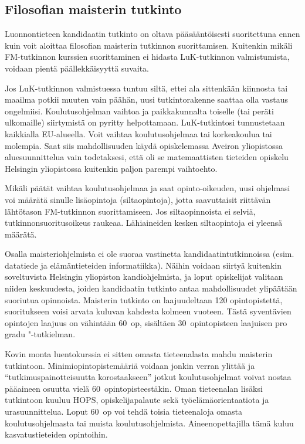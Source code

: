 \documentclass[a5paper, 8pt, twocolumn]{book} %
\numberwithin{equation}{section}
\begin{document}
\subsection*{Filosofian maisterin tutkinto}
Luonnontieteen kandidaatin tutkinto
on oltava pääsääntöisesti suoritettuna ennen
kuin voit aloittaa filosofian maisterin
tutkinnon suorittamisen. Kuitenkin mikäli
FM-tutkinnon kurssien suorittaminen ei
hidasta LuK-tutkinnon valmistumista, voidaan
pientä päällekkäisyyttä suvaita.

Jos LuK-tutkinnon valmistuessa tuntuu
siltä, ettei ala sittenkään kiinnosta tai
maailma potkii muuten vain päähän, uusi
tutkintorakenne saattaa olla vastaus ongelmiisi.
Koulutusohjelman vaihtoa ja paikkakunnalta
toiselle (tai peräti ulkomaille) siirtymistä
on pyritty helpottamaan. LuK-tutkintosi
tunnustetaan kaikkialla EU-alueella. Voit
vaihtaa koulutusohjelmaa tai korkeakoulua tai
molempia. Saat siis mahdollisuuden käydä
opiskelemassa Aveiron yliopistossa aluesuunnittelua
vain todetaksesi, että oli se
matemaattisten tieteiden opiskelu Helsingin yliopistossa
kuitenkin paljon parempi vaihtoehto.

Mikäli päätät vaihtaa koulutusohjelmaa ja saat
opinto-oikeuden, uusi ohjelmasi voi
määrätä sinulle lisäopintoja (siltaopintoja), jotta
saavuttaisit riittävän lähtötason FM-tutkinnon
suorittamiseen. Jos siltaopinnoista ei
selviä, tutkinnonsuoritusoikeus
raukeaa. Lähiaineiden kesken siltaopintoja ei yleensä
määrätä.

Osalla maisteriohjelmista ei ole suoraa vastinetta kandidaatintutkinnoissa (esim.\,datatiede ja elämäntieteiden informatiikka). Näihin voidaan siirtyä kuitenkin soveltuvista Helsingin yliopiston kandiohjelmista, ja loput opiskelijat valitaan niiden keskuudesta, joiden kandidaatin tutkinto
antaa mahdollisuudet ylipäätään suoriutua opinnoista. Maisterin tutkinto on laajuudeltaan 120
opintopistettä, suoritukseen voisi arvata kuluvan kahdesta kolmeen vuoteen. Tästä syventävien opintojen laajuus on vähintään 60~op, sisältäen
30~opintopisteen laajuisen pro gradu "-tutkielman. 

Kovin monta luentokurssia
ei sitten omasta tieteenalasta mahdu
maisterin tutkintoon. Minimiopintopistemääriä
voidaan jonkin verran ylittää ja
``tutkimuspainotteisuutta korostaakseen''
jotkut koulutusohjelmat voivat nostaa pääaineen
osuutta vielä 60~opintopisteestäkin.
Oman tieteenalan lisäksi tutkintoon kuuluu HOPS, opiskelijapalaute
sekä työelämäorientaatiota ja urasuunnittelua. Loput 60~op voi tehdä toisia tieteenaloja omasta koulutusohjelmasta tai muista koulutusohjelmista. Aineenopettajilla tämä kuluu kasvatustieteiden opintoihin.
\end{document}
